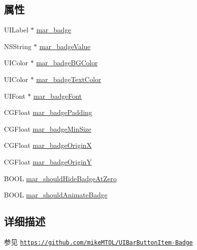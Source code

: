 \subsection*{属性}
\begin{DoxyCompactItemize}
\item 
U\+I\+Label $\ast$ \hyperlink{category_u_i_bar_button_item_07_m_a_r_e_x___badge_08_a8b61537fda00c27593534947adc7c193}{mar\+\_\+badge}
\item 
N\+S\+String $\ast$ \hyperlink{category_u_i_bar_button_item_07_m_a_r_e_x___badge_08_af229380d577e4dade9efc90d7e67795c}{mar\+\_\+badge\+Value}
\item 
U\+I\+Color $\ast$ \hyperlink{category_u_i_bar_button_item_07_m_a_r_e_x___badge_08_af8653fbc96d62bad6a2df7e481790164}{mar\+\_\+badge\+B\+G\+Color}
\item 
U\+I\+Color $\ast$ \hyperlink{category_u_i_bar_button_item_07_m_a_r_e_x___badge_08_a3c820db3fc892f75025c0f96c53d34b8}{mar\+\_\+badge\+Text\+Color}
\item 
U\+I\+Font $\ast$ \hyperlink{category_u_i_bar_button_item_07_m_a_r_e_x___badge_08_a5fdc0b1f8129fe66da8e13ced010b4d8}{mar\+\_\+badge\+Font}
\item 
C\+G\+Float \hyperlink{category_u_i_bar_button_item_07_m_a_r_e_x___badge_08_aae31f4be03a0d1ab8f7cc5366b9665d9}{mar\+\_\+badge\+Padding}
\item 
C\+G\+Float \hyperlink{category_u_i_bar_button_item_07_m_a_r_e_x___badge_08_ab52c48d31595e2f12e9f8f7b6403a15b}{mar\+\_\+badge\+Min\+Size}
\item 
C\+G\+Float \hyperlink{category_u_i_bar_button_item_07_m_a_r_e_x___badge_08_a9578ad7d41f3899bda62550bd50f2762}{mar\+\_\+badge\+OriginX}
\item 
C\+G\+Float \hyperlink{category_u_i_bar_button_item_07_m_a_r_e_x___badge_08_a6913b0a2555cd6ca57d062923fd4b9ff}{mar\+\_\+badge\+OriginY}
\item 
B\+O\+OL \hyperlink{category_u_i_bar_button_item_07_m_a_r_e_x___badge_08_a4f2ad5586d6f685c3404f0f21ae86740}{mar\+\_\+should\+Hide\+Badge\+At\+Zero}
\item 
B\+O\+OL \hyperlink{category_u_i_bar_button_item_07_m_a_r_e_x___badge_08_a6ad88a00b3eb04c04aa885d3b5748fb4}{mar\+\_\+should\+Animate\+Badge}
\end{DoxyCompactItemize}


\subsection{详细描述}
\begin{DoxySeeAlso}{参见}
\href{https://github.com/mikeMTOL/UIBarButtonItem-Badge}{\tt https\+://github.\+com/mike\+M\+T\+O\+L/\+U\+I\+Bar\+Button\+Item-\/\+Badge} 
\end{DoxySeeAlso}


